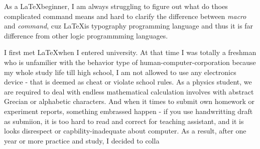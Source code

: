     As a \LaTeX beginner, I am always struggling  to figure out what do thoes complicated command means and hard to clarify the difference between \emph{macro} and \emph{command}, cuz \LaTeX is typography programming language and thus it is far difference from other logic programmming languages. 

    I first met \LaTeX when I entered university. At that time I was totally a freshman who is unfamilier with the behavior type of human-computer-corporation because my whole study life till high school, I am not allowed to use any electronics device - that is deemed as cheat or violate school rules. As a physics student, we are required to deal with endless mathematical calculation involves with abstract Grecian or alphabetic characters. And when it times to submit own homework or experiment reports, something embrassed happen - if you use handwritting draft as submiion, it is too hard to read and correct for teaching assistant, and it is looks disrespect or capbility-inadequate about computer. As a result, after one year or more practice and study, I decided to colla